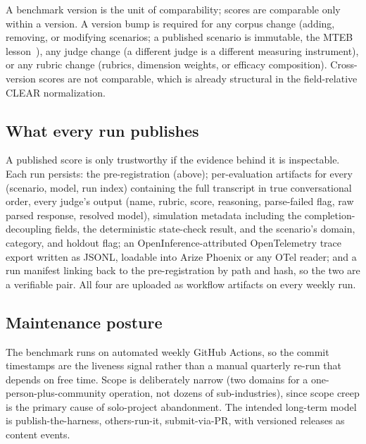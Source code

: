 \label{sec:versioning}
A benchmark version is the unit of comparability; scores are comparable only within
a version. A version bump is required for any corpus change (adding, removing, or
modifying scenarios; a published scenario is immutable, the MTEB
lesson~\cite{mteb2025}), any judge change (a different judge is a different measuring
instrument), or any rubric change (rubrics, dimension weights, or efficacy
composition). Cross-version scores are not comparable, which is already structural
in the field-relative CLEAR normalization.

\subsection{What every run publishes}

A published score is only trustworthy if the evidence behind it is inspectable. Each
run persists: the pre-registration (above); per-evaluation artifacts for every
(scenario, model, run index) containing the full transcript in true conversational
order, every judge's output (name, rubric, score, reasoning, parse-failed flag, raw
parsed response, resolved model), simulation metadata including the
completion-decoupling fields, the deterministic state-check result, and the
scenario's domain, category, and holdout flag; an OpenInference-attributed
OpenTelemetry trace export written as JSONL, loadable into Arize Phoenix or any OTel
reader; and a run manifest linking back to the pre-registration by path and hash, so
the two are a verifiable pair. All four are uploaded as workflow artifacts on every
weekly run.

\subsection{Maintenance posture}

The benchmark runs on automated weekly GitHub Actions, so the commit timestamps are
the liveness signal rather than a manual quarterly re-run that depends on free time.
Scope is deliberately narrow (two domains for a one-person-plus-community operation,
not dozens of sub-industries), since scope creep is the primary cause of
solo-project abandonment. The intended long-term model is publish-the-harness,
others-run-it, submit-via-PR, with versioned releases as content events.
